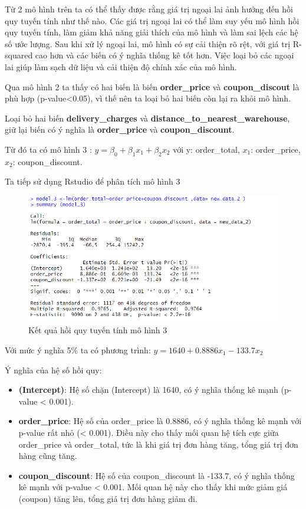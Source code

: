 Từ 2 mô hình trên ta có thể thấy được rằng giá trị ngoại lai ảnh hưởng đến hồi quy tuyến tính như thế nào. Các giá trị ngoại lai có thể làm suy yếu mô hình hồi quy tuyến tính, làm giảm khả năng giải thích của mô hình và làm sai lệch các hệ số ước lượng. Sau khi xử lý ngoại lai, mô hình có sự cải thiện rõ rệt, với giá trị R-squared cao hơn và các biến có ý nghĩa thống kê tốt hơn. Việc loại bỏ các ngoại lai giúp làm sạch dữ liệu và cải thiện độ chính xác của mô hình.

Qua mô hình 2 ta thấy có hai biến là biến \textbf{order\_price} và \textbf{coupon\_discout} là phù hợp (p-value<0.05), vì thế nên ta loại bỏ hai biến còn lại ra khỏi mô hình.

Loại bỏ hai biến \textbf{delivery\_charges} và \textbf{distance\_to\_nearest\_warehouse}, giữ lại biến có ý nghĩa là \textbf{order\_price} và \textbf{coupon\_discount}.

Từ đó ta có mô hình 3 : $y= \beta_0 + \beta_1x_1 + \beta_2x_2$ với y: order\_total, $x_1$: order\_price, $x_2$: coupon\_discount.

Ta tiếp sử dụng Rstudio để phân tích mô hình 3
\begin{figure}[!htp]
  \centering
  \includegraphics[width=0.7\linewidth]{graphics/5.5.4.png}
  \caption{Kết quả hồi quy tuyến tính mô hình 3 }
\end{figure}

Với mức ý nghĩa 5\% ta có phương trình: $y= 1640 + 0.8886x_1 - 133.7 x_2$

Ý nghĩa của hệ số hồi quy:
\begin{itemize}
\item\textbf{(Intercept)}: Hệ số chặn (Intercept) là 1640, có ý nghĩa thống kê mạnh (p-value < 0.001).
\item\textbf{order\_price}: Hệ số của order\_price là 0.8886, có ý nghĩa thống kê mạnh với p-value rất nhỏ (< 0.001). Điều này cho thấy mối quan hệ tích cực giữa order\_price và order\_total, tức là khi giá trị đơn hàng tăng, tổng giá trị đơn hàng cũng tăng.
\item\textbf{coupon\_discount}: Hệ số của coupon\_discount là -133.7, có ý nghĩa thống kê mạnh với p-value < 0.001. Mối quan hệ này cho thấy khi mức giảm giá (coupon) tăng lên, tổng giá trị đơn hàng giảm đi.
\end{itemize}


